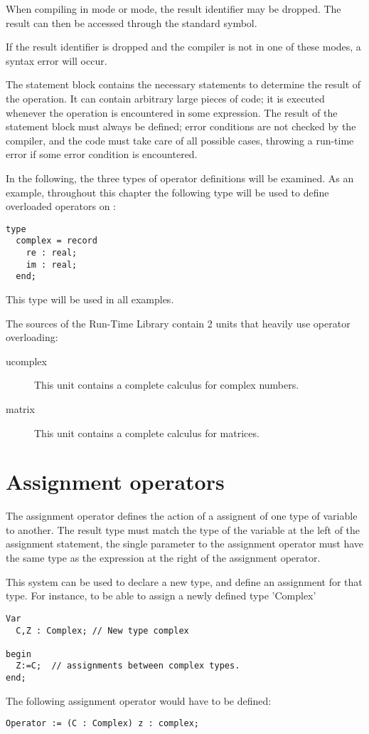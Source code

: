\begin{remark}
When compiling in  mode or  mode, the result
identifier may be dropped. The result can then be accessed through
the standard  symbol.

If the result identifier is dropped and the compiler is not in one
of these modes, a syntax error will occur.
\end{remark}

The statement block contains the necessary statements to determine the
result of the operation. It can contain arbitrary large pieces of code;
it is executed whenever the operation is encountered in some expression.
The result of the statement block must always be defined; error conditions
are not checked by the compiler, and the code must take care of all possible
cases, throwing a run-time error if some error condition is encountered.

In the following, the three types of operator definitions will be examined.
As an example, throughout this chapter the following type will be used to
define overloaded operators on :
\begin{verbatim}
type
  complex = record
    re : real;
    im : real;
  end;
\end{verbatim}
This type will be used in all examples.

The sources of the Run-Time Library contain 2 units that heavily use
operator overloading:
\begin{description}
\item[ucomplex] This unit contains a complete calculus for complex numbers.
\item[matrix] This unit contains a complete calculus for matrices.
\end{description}

\section{Assignment operators}
The assignment operator defines the action of a assignent of one type of
variable to another. The result type must match the type of the variable
at the left of the assignment statement, the single parameter to the
assignment operator must have the same type as the expression at the
right of the assignment operator.

This system can be used to declare a new type, and define an assignment for
that type. For instance, to be able to assign a newly defined type 'Complex'
\begin{verbatim}
Var
  C,Z : Complex; // New type complex

begin
  Z:=C;  // assignments between complex types.
end;
\end{verbatim}
The following assignment operator would have to be defined:
\begin{verbatim}
Operator := (C : Complex) z : complex;
\end{verbatim}

